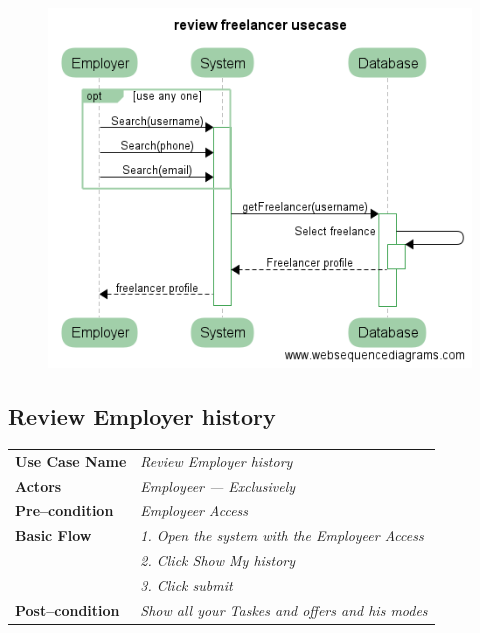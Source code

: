 \documentclass{article}
\begin{document}
\begin{figure}[ht!]
\centering
\includegraphics[width=128mm]{Search_freelancer_usecase.png}
\end{figure}



\subsection{Review Employer history}
    \begin{tabular}{ l | l }
    \toprule
      \rowcolor{LightCyan}
      \textbf{Use Case Name}    & \textit{Review Employer history}\\
      \textbf{Actors}           & \textit{Employeer --- Exclusively}\\
      \rowcolor{LightCyan}
      \textbf{Pre--condition}   & \textit{Employeer Access}\\
      \textbf{Basic Flow}       & \textit{1. Open the system with the Employeer Access}\\
                                & \textit{2. Click Show My history}\\
                                & \textit{3. Click submit}\\
      \rowcolor{LightCyan}
      \textbf{Post--condition}  & \textit{Show all your Taskes and offers and his modes}\\
    \toprule
    \end{tabular}
\end{document}
